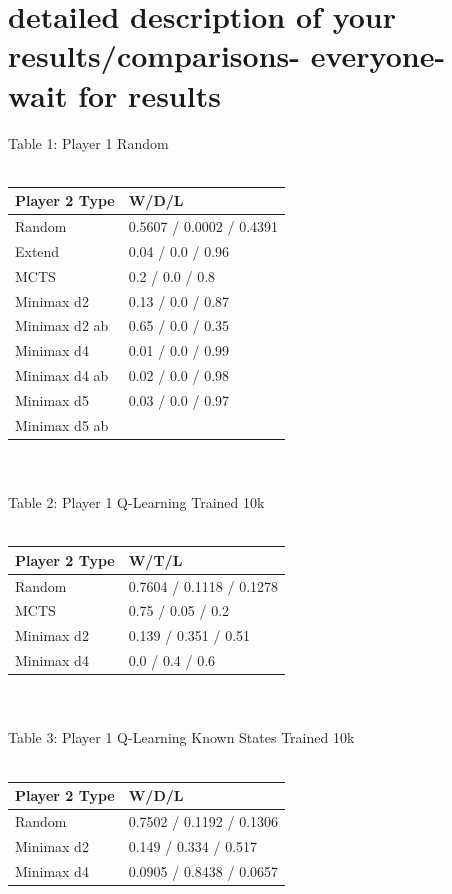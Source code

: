 \documentclass[12pt]{article}
\begin{document}
\section{detailed description of your results/comparisons- everyone- wait for results}
Table 1: Player 1 Random\\\\
\begin{tabular}{l | l}
Player 2 Type & W/D/L                    \\ \hline
Random        & 0.5607 / 0.0002 / 0.4391 \\
Extend        & 0.04 / 0.0 / 0.96        \\
MCTS          & 0.2 / 0.0 / 0.8          \\
Minimax d2    & 0.13 / 0.0 / 0.87        \\
Minimax d2 ab & 0.65 / 0.0 / 0.35        \\
Minimax d4    & 0.01 / 0.0 / 0.99        \\
Minimax d4 ab & 0.02 / 0.0 / 0.98        \\
Minimax d5    & 0.03 / 0.0 / 0.97        \\
Minimax d5 ab &                         
\end{tabular}\\\\
Table 2: Player 1 Q-Learning Trained 10k\\\\
\begin{tabular}{l|l}
Player 2 Type               & W/T/L                                     \\ \hline
Random     & 0.7604 / 0.1118 / 0.1278 \\
MCTS                        & 0.75 / 0.05 / 0.2  \\                      
Minimax d2 & 0.139 / 0.351 / 0.51     \\
Minimax d4 & 0.0 / 0.4 / 0.6
\end{tabular}\\\\
Table 3: Player 1 Q-Learning Known States Trained 10k\\\\
\begin{tabular}{l|l}
Player 2 Type & W/D/L                    \\ \hline
Random        & 0.7502 / 0.1192 / 0.1306 \\
Minimax d2    & 0.149 / 0.334 / 0.517    \\
Minimax d4    &  0.0905 / 0.8438 / 0.0657                       
\end{tabular}\\\\
\end{document}
